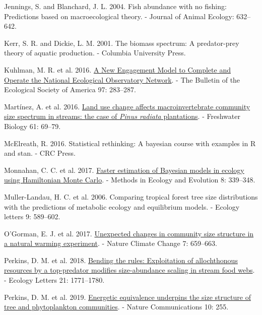 \documentclass[
  12pt,
]{article}
\newlength{\cslhangindent}
\newlength{\cslentryspacingunit} %
\newenvironment{CSLReferences}[2] %
 {%
  \setlength{\parindent}{0pt}
  \ifodd #1
  \let\oldpar\par
  \def\par{\hangindent=\cslhangindent\oldpar}
  \fi
  \setlength{\parskip}{#2\cslentryspacingunit}
 }%
 {}
\begin{document}
\begin{CSLReferences}{1}{0}
\leavevmode{}%
Jennings, S. and Blanchard, J. L. 2004. Fish abundance with no fishing:
Predictions based on macroecological theory. - Journal of Animal
Ecology: 632--642.

\leavevmode{}%
Kerr, S. R. and Dickie, L. M. 2001. The biomass spectrum: {A}
predator-prey theory of aquatic production. - {Columbia University
Press}.

\leavevmode{}%
Kuhlman, M. R. et al. 2016. \href{https://doi.org/10.1002/bes2.1248}{A
{New Engagement Model} to {Complete} and {Operate} the {National
Ecological Observatory Network}}. - The Bulletin of the Ecological
Society of America 97: 283--287.

\leavevmode{}%
Martínez, A. et al. 2016. \href{https://doi.org/10.1111/fwb.12680}{Land
use change affects macroinvertebrate community size spectrum in streams:
the case of {\emph{Pinus radiata}} plantations}. - Freshwater Biology
61: 69--79.

\leavevmode{}%
McElreath, R. 2016. Statistical rethinking: {A} bayesian course with
examples in {R} and stan. - {CRC Press}.

\leavevmode{}%
Monnahan, C. C. et al. 2017.
\href{https://doi.org/10.1111/2041-210X.12681}{Faster estimation of
{Bayesian} models in ecology using {Hamiltonian Monte Carlo}}. - Methods
in Ecology and Evolution 8: 339--348.

\leavevmode{}%
Muller-Landau, H. C. et al. 2006. Comparing tropical forest tree size
distributions with the predictions of metabolic ecology and equilibrium
models. - Ecology letters 9: 589--602.

\leavevmode{}%
O'Gorman, E. J. et al. 2017.
\href{https://doi.org/10.1038/nclimate3368}{Unexpected changes in
community size structure in a natural warming experiment}. - Nature
Climate Change 7: 659--663.

\leavevmode{}%
Perkins, D. M. et al. 2018.
\href{https://doi.org/10.1111/ele.13147}{Bending the rules: Exploitation
of allochthonous resources by a top-predator modifies size-abundance
scaling in stream food webs}. - Ecology Letters 21: 1771--1780.

\leavevmode{}%
Perkins, D. M. et al. 2019.
\href{https://doi.org/10.1038/s41467-018-08039-3}{Energetic equivalence
underpins the size structure of tree and phytoplankton communities}. -
Nature Communications 10: 255.


\end{CSLReferences}
\end{document}

